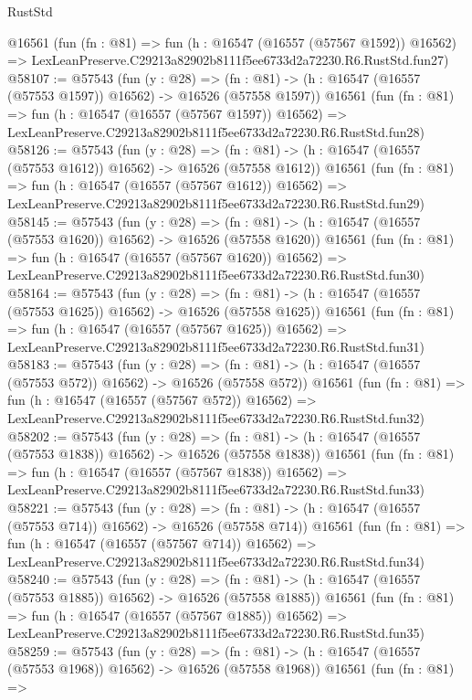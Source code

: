 \begin{lexlean}{RustStd}
\begin{coremodule}
    @16561
    (fun (fn : @81) =>
    fun (h : @16547 (@16557 (@57567 @1592)) @16562) =>
    LexLeanPreserve.C29213a82902b8111f5ee6733d2a72230.R6.RustStd.fun27)
@58107 := @57543
    (fun (y : @28) =>
    (fn : @81) -> (h : @16547 (@16557 (@57553 @1597)) @16562) -> @16526 (@57558 @1597))
    @16561
    (fun (fn : @81) =>
    fun (h : @16547 (@16557 (@57567 @1597)) @16562) =>
    LexLeanPreserve.C29213a82902b8111f5ee6733d2a72230.R6.RustStd.fun28)
@58126 := @57543
    (fun (y : @28) =>
    (fn : @81) -> (h : @16547 (@16557 (@57553 @1612)) @16562) -> @16526 (@57558 @1612))
    @16561
    (fun (fn : @81) =>
    fun (h : @16547 (@16557 (@57567 @1612)) @16562) =>
    LexLeanPreserve.C29213a82902b8111f5ee6733d2a72230.R6.RustStd.fun29)
@58145 := @57543
    (fun (y : @28) =>
    (fn : @81) -> (h : @16547 (@16557 (@57553 @1620)) @16562) -> @16526 (@57558 @1620))
    @16561
    (fun (fn : @81) =>
    fun (h : @16547 (@16557 (@57567 @1620)) @16562) =>
    LexLeanPreserve.C29213a82902b8111f5ee6733d2a72230.R6.RustStd.fun30)
@58164 := @57543
    (fun (y : @28) =>
    (fn : @81) -> (h : @16547 (@16557 (@57553 @1625)) @16562) -> @16526 (@57558 @1625))
    @16561
    (fun (fn : @81) =>
    fun (h : @16547 (@16557 (@57567 @1625)) @16562) =>
    LexLeanPreserve.C29213a82902b8111f5ee6733d2a72230.R6.RustStd.fun31)
@58183 := @57543
    (fun (y : @28) =>
    (fn : @81) -> (h : @16547 (@16557 (@57553 @572)) @16562) -> @16526 (@57558 @572))
    @16561
    (fun (fn : @81) =>
    fun (h : @16547 (@16557 (@57567 @572)) @16562) =>
    LexLeanPreserve.C29213a82902b8111f5ee6733d2a72230.R6.RustStd.fun32)
@58202 := @57543
    (fun (y : @28) =>
    (fn : @81) -> (h : @16547 (@16557 (@57553 @1838)) @16562) -> @16526 (@57558 @1838))
    @16561
    (fun (fn : @81) =>
    fun (h : @16547 (@16557 (@57567 @1838)) @16562) =>
    LexLeanPreserve.C29213a82902b8111f5ee6733d2a72230.R6.RustStd.fun33)
@58221 := @57543
    (fun (y : @28) =>
    (fn : @81) -> (h : @16547 (@16557 (@57553 @714)) @16562) -> @16526 (@57558 @714))
    @16561
    (fun (fn : @81) =>
    fun (h : @16547 (@16557 (@57567 @714)) @16562) =>
    LexLeanPreserve.C29213a82902b8111f5ee6733d2a72230.R6.RustStd.fun34)
@58240 := @57543
    (fun (y : @28) =>
    (fn : @81) -> (h : @16547 (@16557 (@57553 @1885)) @16562) -> @16526 (@57558 @1885))
    @16561
    (fun (fn : @81) =>
    fun (h : @16547 (@16557 (@57567 @1885)) @16562) =>
    LexLeanPreserve.C29213a82902b8111f5ee6733d2a72230.R6.RustStd.fun35)
@58259 := @57543
    (fun (y : @28) =>
    (fn : @81) -> (h : @16547 (@16557 (@57553 @1968)) @16562) -> @16526 (@57558 @1968))
    @16561
    (fun (fn : @81) =>

\end{coremodule}
\end{lexlean}

